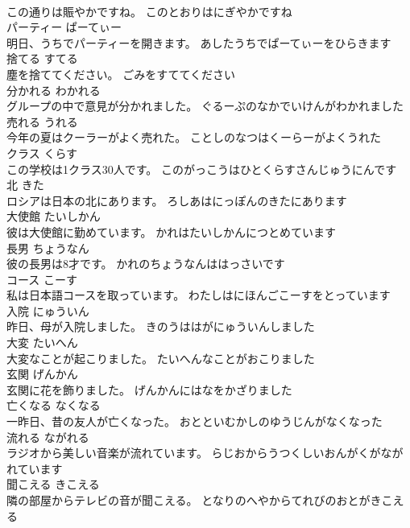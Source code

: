 \documentclass[8pt]{extreport}
\begin{document}
\begin{CJK}{UTF8}{min}
\\	この通りは賑やかですね。	このとおりはにぎやかですね	
\\	パーティー	ぱーてぃー	
\\	明日、うちでパーティーを開きます。	あしたうちでぱーてぃーをひらきます	
\\	捨てる	すてる	
\\	塵を捨ててください。	ごみをすててください	
\\	分かれる	わかれる	
\\	グループの中で意見が分かれました。	ぐるーぷのなかでいけんがわかれました	
\\	売れる	うれる	
\\	今年の夏はクーラーがよく売れた。	ことしのなつはくーらーがよくうれた	
\\	クラス	くらす	
\\	この学校は1クラス30人です。	このがっこうはひとくらすさんじゅうにんです	
\\	北	きた	
\\	ロシアは日本の北にあります。	ろしあはにっぽんのきたにあります	
\\	大使館	たいしかん	
\\	彼は大使館に勤めています。	かれはたいしかんにつとめています	
\\	長男	ちょうなん	
\\	彼の長男は8才です。	かれのちょうなんははっさいです	
\\	コース	こーす	
\\	私は日本語コースを取っています。	わたしはにほんごこーすをとっています	
\\	入院	にゅういん	
\\	昨日、母が入院しました。	きのうははがにゅういんしました	
\\	大変	たいへん	
\\	大変なことが起こりました。	たいへんなことがおこりました	
\\	玄関	げんかん	
\\	玄関に花を飾りました。	げんかんにはなをかざりました	
\\	亡くなる	なくなる	
\\	一昨日、昔の友人が亡くなった。	おとといむかしのゆうじんがなくなった	
\\	流れる	ながれる	
\\	ラジオから美しい音楽が流れています。	らじおからうつくしいおんがくがながれています	
\\	聞こえる	きこえる	
\\	隣の部屋からテレビの音が聞こえる。	となりのへやからてれびのおとがきこえる	

\end{CJK}
\end{document}
